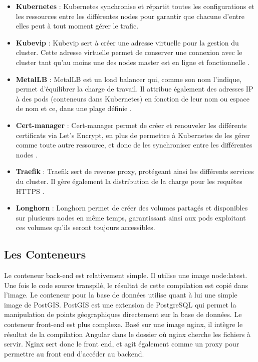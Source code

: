 \begin{itemize}
    \item \textbf{Kubernetes} : Kubernetes synchronise et répartit toutes les configurations et les ressources entre les différentes nodes pour garantir que chacune d'entre elles peut à tout moment gérer le trafic.

    \item \textbf{Kubevip} : Kubevip sert à créer une adresse virtuelle pour la gestion du cluster.
    Cette adresse virtuelle permet de conserver une connexion avec le cluster tant qu'au moins une des nodes master est en ligne et fonctionnelle .

    \item \textbf{MetalLB} : MetalLB est un load balancer qui, comme son nom l'indique, permet d'équilibrer la charge de travail.
    Il attribue également des adresses IP à des pods (conteneurs dans Kubernetes) en fonction de leur nom ou espace de nom et ce, dans une plage définie .

    \item \textbf{Cert-manager} : Cert-manager permet de créer et renouveler les différents certificats via Let's Encrypt, en plus de permettre à Kubernetes de les gérer comme toute autre ressource, et donc de les synchroniser entre les différentes nodes .

    \item \textbf{Traefik} : Traefik sert de reverse proxy, protégeant ainsi les différents services du cluster.
    Il gère également la distribution de la charge pour les requêtes HTTPS .
    \item \textbf{Longhorn} : Longhorn permet de créer des volumes partagés et disponibles sur plusieurs nodes en même temps, garantissant ainsi aux pods exploitant ces volumes qu'ils seront toujours accessibles.
\end{itemize}

\subsection{Les Conteneurs}\label{subsec:les-conteneurs}
Le conteneur back-end est relativement simple.
Il utilise une image node:latest.
Une fois le code source transpilé, le résultat de cette compilation est copié dans l'image.
Le conteneur pour la base de données utilise quant à lui une simple image de PostGIS. PostGIS est une extension de PostgreSQL qui permet la manipulation de points géographiques directement sur la base de données.
Le conteneur front-end est plus complexe.
Basé sur une image nginx, il intègre le résultat de la compilation Angular dans le dossier où nginx cherche les fichiers à servir.
Nginx sert donc le front end, et agit également comme un proxy pour permettre au front end d'accéder au backend.

